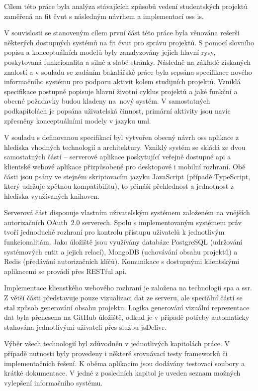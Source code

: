 Cílem této práce byla analýza stávajících způsobů vedení studentských projektů zaměřená na \gls{fit} \gls{čvut} s následným návrhem a implementací \gls{oss} \gls{is}. 

V souvislosti se stanoveným cílem první část této práce byla věnována rešerši některých dostupných systémů na \gls{fit} \gls{čvut} pro správu projektů. S pomocí slovního popisu a konceptuálních modelů byly zanalyzovány jejich hlavní rysy, poskytovaná funkcionalita a silné a slabé stránky. Následně na základě získaných znalostí a v souladu se zadáním bakalářské práce byla sepsána specifikace nového informačního systému pro podporu aktivit kolem studijních projektů. Vzniklá specifikace postupně popisuje hlavní životní cyklus projektů a jaké funkční a obecné požadavky budou kladeny na~nový systém. V samostatných podkapitolách je popsána uživatelská činnost, primární aktivity jsou navíc zpřesněny konceptuálními modely v jazyku \gls{uml}.

V souladu s definovanou specifikací byl vytvořen obecný návrh \gls{oss} aplikace z hlediska vhodných technologií a architektury. Vzniklý systém se skládá ze dvou samostatných částí -- serverové aplikace poskytující veřejně dostupné \gls{api} a klientské webové aplikace přizpůsobené pro desktopové i mobilní rozhraní. Obě části jsou psány ve stejném skriptovacím jazyku JavaScript (případě TypeScript, který udržuje zpětnou kompatibilitu), to přináší přehlednost a jednotnost z hlediska využívaných knihoven. 

Serverová část disponuje vlastním uživatelským systémem založeném na vnějších autorizačních OAuth~2.0 serverech. Spolu s implementovaným systémem práv tvoří jednoduché rozhraní pro kontrolu přístupu uživatelů k jednotlivým funkcionalitám. Jako úložiště jsou využívány databáze PostgreSQL (udržování systémových entit a jejich relací), MongoDB (uchovávání obsahu projektů) a Redis (předávání autorizačních klíčů). Komunikace s dostupnými klientskými aplikacemi se provádí přes RESTful \gls{api}.

Implementace klienstkého webového rozhraní je založena na technologii \gls{spa} a \gls{ssr}. Z větší části představuje pouze vizualizaci dat ze serveru, ale speciální částí se stal způsob generování obsahu projektu. Logika generování vizuální reprezentace dat byla přenesena na GitHub úložiště, odkud je v případě potřeby automaticky stahována jednotlivými uživateli přes službu jsDelivr. 

Výběr všech technologií byl zdůvodněn v jednotlivých kapitolách práce. V případě nutnosti byly provedeny i některé srovnávací testy frameworků či implementačních řešení. K oběma aplikacím jsou dodávány testovací soubory a krátké dokumentace. V jedné z posledních kapitol je uveden seznam možných vylepšení informačního systému.

